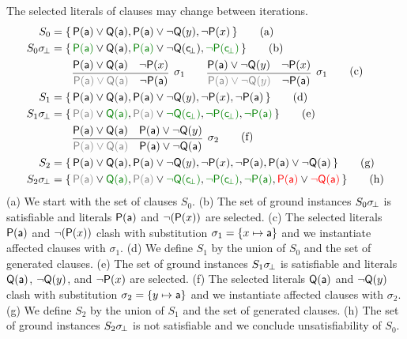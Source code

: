 \begin{example} The selected literals of clauses may change between iterations.
\begin{align*}
S_0 &= \{ \,
	\mP(\ma)\lor\mQ(\ma),
	\mP(\ma)\lor\lnot\mQ(y),
	\lnot\mP(x)
 \, \}
\tag*{(a)}\\
S_0\subsbot &= \{ \,
	{\colHi\mP(\ma)}\lor\mQ(\ma),
	{\colHi\mP(\ma)}\lor\lnot\mQ(\consbot),
	{\colHi\lnot\mP(\consbot)}
 \, \}
\tag*{(b)}\\
&\qquad\infer[
	\sigma_1
	]{
		{\colG \mP(\ma)\lor\mQ(\ma)}\quad\lnot\mP(\ma)
	}{
		\mP(\ma)\lor\mQ(\ma) & \lnot\mP(x)
	}
	\qquad\infer[
	\sigma_1
	]{
		{\colG \mP(\ma)\lor\lnot\mQ(y)}\quad\lnot\mP(\ma)
	}{
		\mP(\ma)\lor \lnot\mQ(y) & \lnot\mP(x)
	}
	\tag*{\raisebox{3mm}{(c)}}\\
S_1 &= \{ \,
	\mP(\ma)\lor\mQ(\ma),
	\mP(\ma)\lor\lnot\mQ(y),
	\lnot\mP(x),
	\lnot\mP(\ma)
 \, \}
 \tag*{(d)}\\
S_1\subsbot &= \{ \,
	{\colG\mP(\ma)}\lor{\colHi\mQ(\ma)},
	{\colG\mP(\ma)}\lor{\colHi\lnot\mQ(\consbot)},
	{\colHi\lnot\mP(\consbot)},
	{\colHi\lnot\mP(\ma)}
 \, \}
\tag*{(e)}\\
&\qquad\infer[
\sigma_2
]{
	{\colG \mP(\ma)\lor\mQ(\ma)}\quad\mP(\ma)\lor\lnot\mQ(\ma)
}{
	\mP(\ma)\lor\mQ(\ma) & \mP(\ma)\lor\lnot\mQ(y)
}
\tag*{\raisebox{3mm}{(f)}}\\
S_2 &= \{ \,
\mP(\ma)\lor\mQ(\ma),
\mP(\ma)\lor\lnot\mQ(y),
\lnot\mP(x),
\lnot\mP(\ma),
\mP(\ma)\lor\lnot\mQ(\ma)
 \, \}
 \tag*{(g)}\\
S_2\subsbot &= \{ \,
{\colG\mP(\ma)}\lor{\colHi\mQ(\ma)},
{\colG\mP(\ma)}\lor{\colHi\lnot\mQ(\consbot)},
{\colHi\lnot\mP(\consbot)},
{\colHi\lnot\mP(\ma)},
{\colLo\mP(\ma)}\lor{\colLo\lnot\mQ(\ma)}
 \, \}
\tag*{(h)}
\end{align*}
    (a) We start with the set of clauses \( S_0 \).
	(b) The set of ground instances \( S_0\sigma \!_\bot \)
	is satisfiable and literals \( \mathsf{P}(\mathsf{a}) \) and \( \lnot(\mathsf{P}(x)) \) are selected.
	(c) The selected literals \( \mathsf{P}(\mathsf{a}) \) and \( \lnot(\mathsf{P}(x)) \) 
	clash with substitution \( \sigma_1 = \{ x\mapsto\mathsf{a} \} \)
	and we instantiate affected clauses with \( \sigma_1 \).
	(d) We define \( S_1 \) by the union of \( S_0 \) and the set of generated clauses.
	(e) The set of ground instances \( S_1\sigma \!_\bot \) is satisfiable 
	and literals \( \mathsf{Q}(\mathsf{a}) \), \( \lnot \mathsf{Q}(y) \), and \( \lnot \mathsf{P}(x) \) are selected.
	(f) The selected literals \( \mathsf{Q}(\mathsf{a}) \) and \( \lnot \mathsf{Q}(y) \) 
	clash with substitution \( \sigma_2 = \{ y\mapsto\mathsf{a} \} \)
	and we instantiate affected clauses with \( \sigma_2 \).
	(g) We define \( S_2 \) by the union of \( S_1 \) and the set of generated clauses.
	(h) The set of ground instances \( S_2\sigma \!_\bot \) is not satisfiable
	and we conclude unsatisfiability of \( S_0 \).
\end{example}

